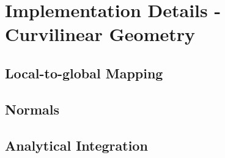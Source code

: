 \section{Implementation Details - Curvilinear Geometry}

\subsection{Local-to-global Mapping}

\subsection{Normals}

\subsection{Analytical Integration}